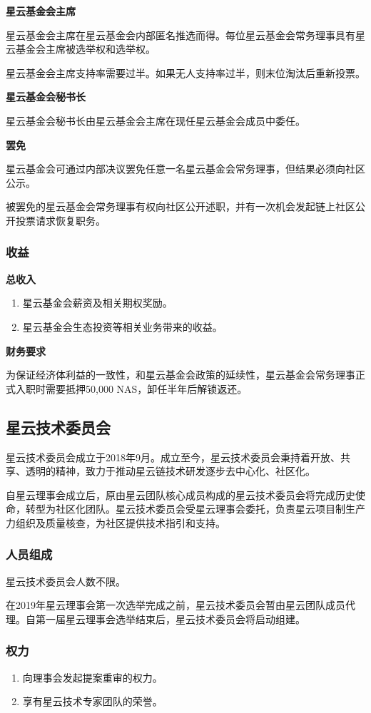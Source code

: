 \textbf{星云基金会主席}

星云基金会主席在星云基金会内部匿名推选而得。每位星云基金会常务理事具有星云基金会主席被选举权和选举权。

星云基金会主席支持率需要过半。如果无人支持率过半，则末位淘汰后重新投票。

\textbf{星云基金会秘书长}

星云基金会秘书长由星云基金会主席在现任星云基金会成员中委任。

\textbf{罢免}

星云基金会可通过内部决议罢免任意一名星云基金会常务理事，但结果必须向社区公示。

被罢免的星云基金会常务理事有权向社区公开述职，并有一次机会发起链上社区公开投票请求恢复职务。


\subsubsection{收益}
\textbf{总收入}

\begin{enumerate}
	\item 星云基金会薪资及相关期权奖励。
    \item 星云基金会生态投资等相关业务带来的收益。
\end{enumerate}

\textbf{财务要求}

为保证经济体利益的一致性，和星云基金会政策的延续性，星云基金会常务理事正式入职时需要抵押50,000 NAS，卸任半年后解锁返还。

\subsection{星云技术委员会}
星云技术委员会成立于2018年9月。成立至今，星云技术委员会秉持着开放、共享、透明的精神，致力于推动星云链技术研发逐步去中心化、社区化。

自星云理事会成立后，原由星云团队核心成员构成的星云技术委员会将完成历史使命，转型为社区化团队。星云技术委员会受星云理事会委托，负责星云项目制生产力组织及质量核查，为社区提供技术指引和支持。

\subsubsection{人员组成}
星云技术委员会人数不限。

在2019年星云理事会第一次选举完成之前，星云技术委员会暂由星云团队成员代理。自第一届星云理事会选举结束后，星云技术委员会将启动组建。

\subsubsection{权力}
\begin{enumerate}
	\item 向理事会发起提案重审的权力。
	\item 享有星云技术专家团队的荣誉。
\end{enumerate}


